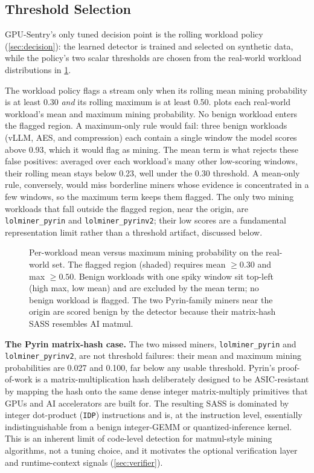 \subsection{Threshold Selection}
\label{sec:thresholds}

GPU-Sentry's only tuned decision point is the rolling workload policy (\cref{sec:decision}): the learned detector is trained and selected on synthetic data, while the policy's two scalar thresholds are chosen from the real-world workload distributions in \cref{fig:decision_threshold}.

The workload policy flags a stream only when its rolling mean mining probability is at least 0.30 \emph{and} its rolling maximum is at least 0.50.  plots each real-world workload's mean and maximum mining probability. No benign workload enters the flagged region. A maximum-only rule would fail: three benign workloads (vLLM, AES, and compression) each contain a single window the model scores above 0.93, which it would flag as mining. The mean term is what rejects these false positives: averaged over each workload's many other low-scoring windows, their rolling mean stays below 0.23, well under the 0.30 threshold. A mean-only rule, conversely, would miss borderline miners whose evidence is concentrated in a few windows, so the maximum term keeps them flagged. The only two mining workloads that fall outside the flagged region, near the origin, are \texttt{lolminer\_pyrin} and \texttt{lolminer\_pyrinv2}; their low scores are a fundamental representation limit rather than a threshold artifact, discussed below.

\begin{figure}[t]
    \centering
    
    \caption{Per-workload mean versus maximum mining probability on the real-world set. The flagged region (shaded) requires mean $\geq 0.30$ and max $\geq 0.50$. Benign workloads with one spiky window sit top-left (high max, low mean) and are excluded by the mean term; no benign workload is flagged. The two Pyrin-family miners near the origin are scored benign by the detector because their matrix-hash SASS resembles AI matmul.}
    \label{fig:decision_threshold}
\end{figure}

\textbf{The Pyrin matrix-hash case.}
The two missed miners, \texttt{lolminer\_pyrin} and \texttt{lolminer\_pyrinv2}, are not threshold failures: their mean and maximum mining probabilities are 0.027 and 0.100, far below any usable threshold. Pyrin's proof-of-work is a matrix-multiplication hash deliberately designed to be ASIC-resistant by mapping the hash onto the same dense integer matrix-multiply primitives that GPUs and AI accelerators are built for. The resulting SASS is dominated by integer dot-product (\texttt{IDP}) instructions and is, at the instruction level, essentially indistinguishable from a benign integer-GEMM or quantized-inference kernel. This is an inherent limit of code-level detection for matmul-style mining algorithms, not a tuning choice, and it motivates the optional verification layer and runtime-context signals (\cref{sec:verifier}).

